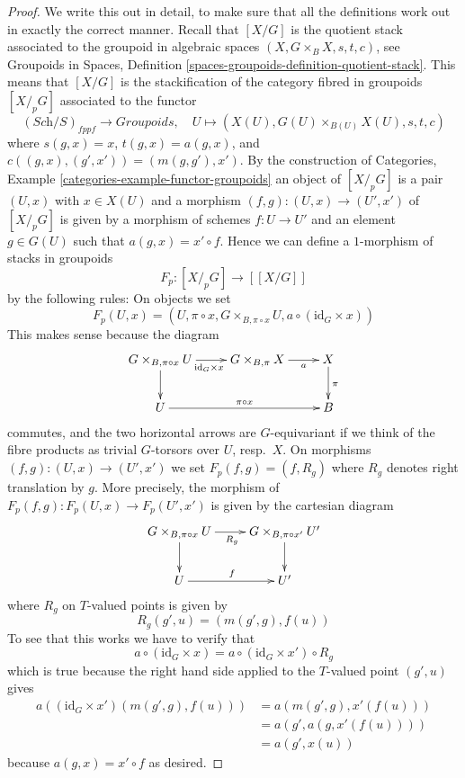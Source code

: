 \begin{proof}
We write this out in detail, to make sure that all the definitions
work out in exactly the correct manner.
Recall that $[X/G]$ is the quotient stack
associated to the groupoid in algebraic spaces
$(X, G \times_B X, s, t, c)$, see
Groupoids in Spaces,
Definition \ref{spaces-groupoids-definition-quotient-stack}.
This means that $[X/G]$ is the stackification of the
category fibred in groupoids $[X/_{\!p}G]$ associated to the functor
$$
(\textit{Sch}/S)_{fppf} \longrightarrow \textit{Groupoids},
\quad
U \longmapsto (X(U), G(U) \times_{B(U)} X(U), s, t, c)
$$
where $s(g, x) = x$, $t(g, x) = a(g, x)$, and
$c((g, x), (g', x')) = (m(g, g'), x')$. By the construction of
Categories, Example \ref{categories-example-functor-groupoids}
an object of $[X/_{\!p}G]$ is a pair $(U, x)$ with $x \in X(U)$
and a morphism $(f, g) : (U, x) \to (U', x')$ of $[X/_{\!p}G]$
is given by a morphism of schemes $f : U \to U'$ and an element
$g \in G(U)$ such that $a(g, x) = x' \circ f$.
Hence we can define a $1$-morphism of stacks in groupoids
$$
F_p : [X/_{\!p}G] \longrightarrow [[X/G]]
$$
by the following rules: On objects we set
$$
F_p(U, x) =
(U, \pi \circ x, G \times_{B, \pi \circ x} U, a \circ (\text{id}_G \times x))
$$
This makes sense because the diagram
$$
\xymatrix{
G \times_{B, \pi \circ x} U \ar[d] \ar[r]_{\text{id}_G \times x} &
G \times_{B, \pi} X \ar[r]_-a &
X \ar[d]^\pi \\
U \ar[rr]^{\pi \circ x} & & B
}
$$
commutes, and the two horizontal arrows are $G$-equivariant if we think
of the fibre products as trivial $G$-torsors over $U$, resp.\ $X$.
On morphisms $(f, g) : (U, x) \to (U', x')$ we set $F_p(f, g) = (f, R_g)$
where $R_g$ denotes right translation by $g$. More precisely, the
morphism of $F_p(f, g) : F_p(U, x) \to F_p(U', x')$ is given by the cartesian
diagram
$$
\xymatrix{
G \times_{B, \pi \circ x} U \ar[d] \ar[r]_{R_g} &
G \times_{B, \pi \circ x'} U' \ar[d] \\
U \ar[r]^f & U'
}
$$
where $R_g$ on $T$-valued points is given by
$$
R_g(g', u) = (m(g', g), f(u))
$$
To see that this works we have to verify that
$$
a \circ (\text{id}_G \times x)
=
a \circ (\text{id}_G \times x') \circ R_g
$$
which is true because the right hand side applied to the $T$-valued point
$(g', u)$ gives
\begin{align*}
a((\text{id}_G \times x')(m(g', g), f(u)))
& =
a(m(g', g), x'(f(u))) \\
& =
a(g', a(g, x'(f(u)))) \\
& =
a(g', x(u))
\end{align*}
because $a(g, x) = x' \circ f$ as desired.


\end{proof}
